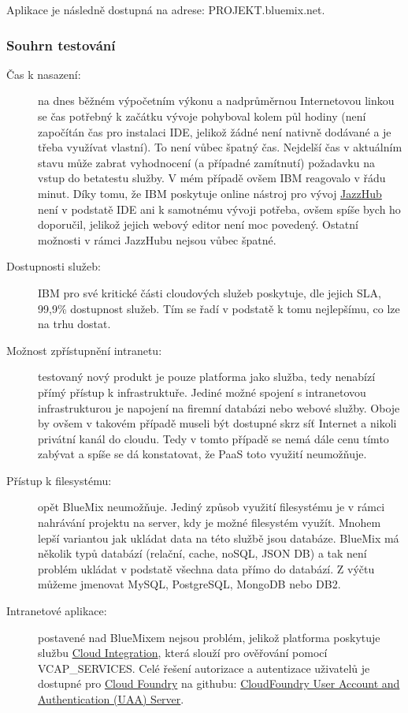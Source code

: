 Aplikace je následně dostupná na adrese: PROJEKT.bluemix.net.

\subsubsection{Souhrn testování}
\begin{description}
	\item [Čas k nasazení:] na dnes běžném výpočetním výkonu a nadprůměrnou Internetovou linkou se čas potřebný k začátku vývoje pohyboval kolem půl hodiny (není započítán čas pro instalaci IDE, jelikož žádné není nativně dodávané a je třeba využívat vlastní). To není vůbec špatný čas. Nejdelší čas v aktuálním stavu může zabrat vyhodnocení (a případné zamítnutí) požadavku na vstup do betatestu služby. V mém případě ovšem IBM reagovalo v řádu minut. Díky tomu, že IBM poskytuje online nástroj pro vývoj \href{https://hub.jazz.net}{JazzHub} není v podstatě IDE ani k samotnému vývoji potřeba, ovšem spíše bych ho doporučil, jelikož jejich webový editor není moc povedený. Ostatní možnosti v rámci JazzHubu nejsou vůbec špatné.
	\item [Dostupnosti služeb:] IBM pro své kritické části cloudových služeb poskytuje, dle jejich SLA, 99,9\% dostupnost služeb. Tím se řadí v podstatě k tomu nejlepšímu, co lze na trhu dostat.
	\item [Možnost zpřístupnění intranetu:] testovaný nový produkt je pouze platforma jako služba, tedy nenabízí přímý přístup k infrastruktuře. Jediné možné spojení s intranetovou infrastrukturou je napojení na firemní databázi nebo webové služby. Oboje by ovšem v takovém případě museli být dostupné skrz síť Internet a nikoli privátní kanál do cloudu. Tedy v tomto případě se nemá dále cenu tímto zabývat a spíše se dá konstatovat, že PaaS toto využití neumožňuje.
	\item [Přístup k filesystému:] opět BlueMix neumožňuje. Jediný způsob využití filesystému je v rámci nahrávání projektu na server, kdy je možné filesystém využít. Mnohem lepší variantou jak ukládat data na této službě jsou databáze. BlueMix má několik typů databází (relační, cache, noSQL, JSON DB) a tak není problém ukládat v podstatě všechna data přímo do databází. Z výčtu můžeme jmenovat MySQL, PostgreSQL, MongoDB nebo DB2.
	\item [Intranetové aplikace:] postavené nad BlueMixem nejsou problém, jelikož platforma poskytuje službu \href{http://www.ng.bluemix.net/docs/Services/CloudIntegration/CloudIntegration.html}{Cloud Integration}, která slouží pro ověřování pomocí VCAP\_SERVICES. Celé řešení autorizace a autentizace uživatelů je dostupné pro \href{http://www.cloudfoundry.org}{Cloud Foundry} na githubu: \href{https://github.com/cloudfoundry/uaa}{CloudFoundry User Account and Authentication (UAA) Server}.

\end{description}
